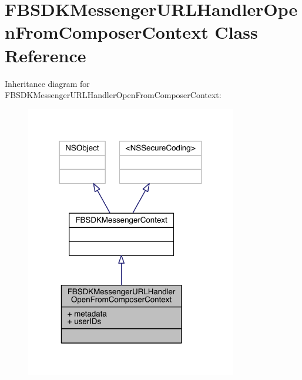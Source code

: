 \hypertarget{interface_f_b_s_d_k_messenger_u_r_l_handler_open_from_composer_context}{\section{F\-B\-S\-D\-K\-Messenger\-U\-R\-L\-Handler\-Open\-From\-Composer\-Context Class Reference}
\label{interface_f_b_s_d_k_messenger_u_r_l_handler_open_from_composer_context}
}


Inheritance diagram for F\-B\-S\-D\-K\-Messenger\-U\-R\-L\-Handler\-Open\-From\-Composer\-Context\-:
\nopagebreak
\begin{figure}[H]
\begin{center}
\leavevmode
\includegraphics[width=261pt]{interface_f_b_s_d_k_messenger_u_r_l_handler_open_from_composer_context__inherit__graph}
\end{center}
\end{figure}


